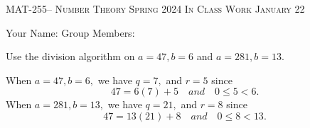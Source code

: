 \documentclass[handout]{ximera}
\date{January 22, 2024}
\begin{document}
\handoutAbstract
\maketitle
    \begin{center}%
            {\large \scshape MAT-255-- Number Theory \hfill Spring 2024 \hfill In Class Work January 22}%
        
        {\large
            Your Name: \hrulefill \quad Group Members:\hrulefill \quad \hrulefill
	    \par}%
    \end{center}%

\begin{br} 
    Use the division algorithm on $a=47, b=6$ and $a=281, b=13$.
    \begin{solution}
        When $a=47, b=6,$ we have $q=7,$ and $r=5$ since \[47=6(7)+5\quad and \quad 0\leq 5 <6.\]
        When $a=281, b=13,$ we have $q=21,$ and $r=8$ since \[47=13(21)+8\quad and \quad 0\leq 8 <13.\]
    \end{solution}
    \pdfOnly{\ifhandout{
        \vfill}
        \else
        \fi}
\end{br}
\end{document}
